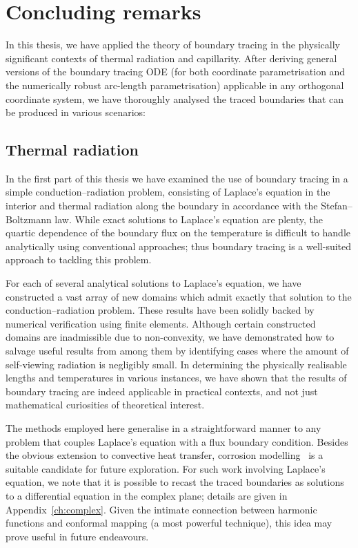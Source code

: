 \chapter{Concluding remarks}
\label{ch:concluding}

In this thesis,
we have applied the theory of boundary tracing
in the physically significant contexts
of thermal radiation and capillarity.
After deriving general versions of the boundary tracing ODE
(for both coordinate parametrisation
and the numerically robust arc-length parametrisation)
applicable in any orthogonal coordinate system,
we have thoroughly analysed
the traced boundaries that can be produced in various scenarios:

\section{Thermal radiation}
\label{sec:concluding.radiation}

In the first part of this thesis we have examined the use of boundary tracing
in a simple conduction--radiation problem,
consisting of Laplace's equation in the interior
and thermal radiation along the boundary
in accordance with the Stefan--Boltzmann law.
While exact solutions to Laplace's equation are plenty,
the quartic dependence of the boundary flux on the temperature
is difficult to handle analytically using conventional approaches;
thus boundary tracing is a well-suited approach to tackling this problem.

For each of several analytical solutions to Laplace's equation,
we have constructed a vast array of new domains
which admit exactly that solution
to the conduction--radiation problem.
These results have been solidly backed
by numerical verification using finite elements.
Although certain constructed domains are inadmissible
due to non-convexity,
we have demonstrated how to salvage useful results from among them
by identifying cases
where the amount of self-viewing radiation is negligibly small.
In determining the physically realisable lengths and temperatures
in various instances,
we have shown that the results of boundary tracing
are indeed applicable in practical contexts,
and not just mathematical curiosities of theoretical interest.

The methods employed here
generalise in a straightforward manner
to any problem
that couples Laplace's equation with a flux boundary condition.
Besides the obvious extension to convective heat transfer,
corrosion modelling~\cite{
  bryan-2002-singular-nonlinear-elliptic-corrosion,
  vogelius-1998-nonlinear-elliptic-bvp-corrosion
}
is a suitable candidate for future exploration.
For such work involving Laplace's equation,
we note that it is possible to recast the traced boundaries
as solutions to a differential equation in the complex plane;
details are given in Appendix~\ref{ch:complex}\@.
Given the intimate connection between
harmonic functions and conformal mapping (a most powerful technique),
this idea may prove useful in future endeavours.

